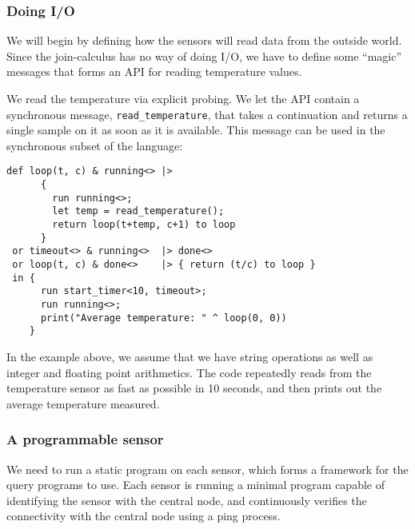 \subsubsection{Doing I/O}

We will begin by defining how the sensors will read data from the
outside world. Since the join-calculus has no way of doing I/O, we
have to define some ``magic'' messages that forms an API for reading
temperature values.

We read the temperature via explicit probing. We let the API
contain a synchronous message, \verb!read_temperature!, that takes
a continuation and returns a single sample on it as soon as it is
available. This message can be used in the synchronous subset of
the language:

\begin{verbatim}
def loop(t, c) & running<> |>
      {
        run running<>;
        let temp = read_temperature();
        return loop(t+temp, c+1) to loop
      }
 or timeout<> & running<>  |> done<>
 or loop(t, c) & done<>    |> { return (t/c) to loop }
 in {
      run start_timer<10, timeout>;
      run running<>;
      print("Average temperature: " ^ loop(0, 0))
    }
\end{verbatim}

In the example above, we assume that we have string operations as
well as integer and floating point arithmetics. The code repeatedly
reads from the temperature sensor as fast as possible in 10
seconds, and then prints out the average temperature measured.

\subsubsection{A programmable sensor}

We need to run a static program on each sensor, which forms a framework
for the query programs to use.
Each sensor is running a minimal program capable of identifying the
sensor with the central node, and continuously verifies the
connectivity with the central node using a ping process.

